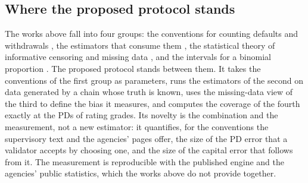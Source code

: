 \subsection{Where the proposed protocol stands}
\label{sec:rw-position}

The works above fall into four groups: the conventions for counting defaults and withdrawals \citep{EBA_2017,Schuermann_2004,Cantor_2007,ESMA_CEREP}, the estimators that consume them \citep{Anderson_1957,Lando_2002,Israel_2001,Bladt_2005}, the statistical theory of informative censoring and missing data \citep{Tsiatis_1975,Rubin_1976,Manski_1989}, and the intervals for a binomial proportion \citep{Brown_2001,Wilson_1927,Agresti_1998}. The proposed protocol stands between them. It takes the conventions of the first group as parameters, runs the estimators of the second on data generated by a chain whose truth is known, uses the missing-data view of the third to define the bias it measures, and computes the coverage of the fourth exactly at the PDs of rating grades. Its novelty is the combination and the measurement, not a new estimator: it quantifies, for the conventions the supervisory text and the agencies' pages offer, the size of the PD error that a validator accepts by choosing one, and the size of the capital error that follows from it. The measurement is reproducible with the published engine and the agencies' public statistics, which the works above do not provide together.
